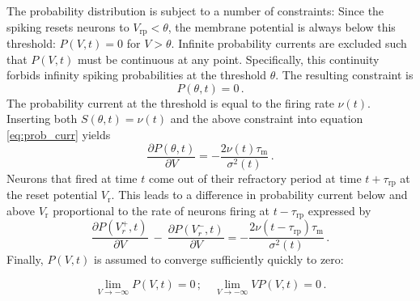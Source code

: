 The probability distribution is subject to a number of 
constraints: Since the spiking resets neurons to $V_\text{rp} < \theta$, 
the membrane potential is always below this threshold:
$P(V, t) = 0$ for $V > \theta$. Infinite probability currents are excluded 
such that $P(V, t)$ must be continuous at any point. Specifically, 
this continuity forbids infinity spiking probabilities at the threshold $\theta$. 
The resulting constraint is 
\begin{equation}
    P(\theta, t) = 0 \,.
    \label{eq:continuity} 
\end{equation}
The probability current at the threshold is equal to the firing rate
$\nu(t)$. Inserting both $S(\theta, t) = \nu(t)$ and the above constraint into 
equation \eqref{eq:prob_curr} yields
\begin{equation}
    \frac{\partial P(\theta, t)}{\partial V}    
        = - \frac{2 \nu(t) \tau_\text{m}}{\sigma^2(t)}  \,.
\end{equation}
Neurons that fired at time $t$ come out of their refractory period at 
time $t + \tau_\text{rp}$ at the reset potential $V_\text{r}$. This leads to
a difference in probability current below and above $V_\text{r}$ proportional to 
the rate of neurons firing at $t - \tau_\text{rp}$ expressed by
\begin{equation}
    \frac{\partial P(V_r^+, t)}{\partial V} \: -  \: \frac{\partial P(V_r^-, t)}{\partial V} 
        = - \frac{2 \nu(t - \tau_\text{rp}) \tau_\text{m}}{\sigma^2(t)} \,.
\end{equation}
Finally, $P(V, t)$ is assumed to converge sufficiently quickly to zero:

\begin{equation}
\lim_{V \to -\infty} P(V, t) = 0 \, ;
    \quad 
    \lim_{V \to -\infty} V P(V, t) = 0 \,.
\end{equation}

